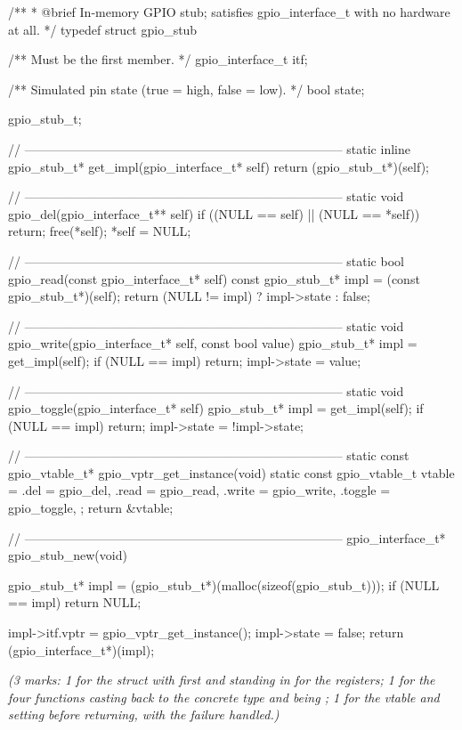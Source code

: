 \begin{ccode}
/**
 * @brief In-memory GPIO stub; satisfies gpio_interface_t with no hardware at all.
 */
typedef struct gpio_stub
{
    /** Must be the first member. */
    gpio_interface_t itf;

    /** Simulated pin state (true = high, false = low). */
    bool state;
} gpio_stub_t;

// -----------------------------------------------------------------------------
static inline gpio_stub_t* get_impl(gpio_interface_t* self) { return (gpio_stub_t*)(self); }

// -----------------------------------------------------------------------------
static void gpio_del(gpio_interface_t** self)
{
    if ((NULL == self) || (NULL == *self)) { return; }
    free(*self);
    *self = NULL;
}

// -----------------------------------------------------------------------------
static bool gpio_read(const gpio_interface_t* self)
{
    const gpio_stub_t* impl = (const gpio_stub_t*)(self);
    return (NULL != impl) ? impl->state : false;
}

// -----------------------------------------------------------------------------
static void gpio_write(gpio_interface_t* self, const bool value)
{
    gpio_stub_t* impl = get_impl(self);
    if (NULL == impl) { return; }
    impl->state = value;
}

// -----------------------------------------------------------------------------
static void gpio_toggle(gpio_interface_t* self)
{
    gpio_stub_t* impl = get_impl(self);
    if (NULL == impl) { return; }
    impl->state = !impl->state;
}

// -----------------------------------------------------------------------------
static const gpio_vtable_t* gpio_vptr_get_instance(void)
{
    static const gpio_vtable_t vtable = {
        .del = gpio_del, .read = gpio_read, .write = gpio_write, .toggle = gpio_toggle,
    };
    return &vtable;
}

// -----------------------------------------------------------------------------
gpio_interface_t* gpio_stub_new(void)
{
    gpio_stub_t* impl = (gpio_stub_t*)(malloc(sizeof(gpio_stub_t)));
    if (NULL == impl) { return NULL; }

    impl->itf.vptr = gpio_vptr_get_instance();
    impl->state    = false;
    return (gpio_interface_t*)(impl);
}
\end{ccode}

{\itshape (3 marks: 1 for the struct with  first and  standing in for the
registers; 1 for the four functions casting  back to the concrete type and being
; 1 for the vtable and  setting  before returning,
with the  failure handled.)\par}

